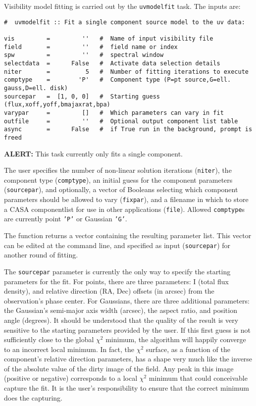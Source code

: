 Visibility model fitting is carried out by the {\tt uvmodelfit} task.
The inputs are:
\small
\begin{verbatim}
#  uvmodelfit :: Fit a single component source model to the uv data:

vis         =         ''   #  Name of input visibility file
field       =         ''   #  field name or index
spw         =         ''   #  spectral window
selectdata  =      False   #  Activate data selection details
niter       =          5   #  Number of fitting iterations to execute
comptype    =        'P'   #  Component type (P=pt source,G=ell. gauss,D=ell. disk)
sourcepar   =  [1, 0, 0]   #  Starting guess (flux,xoff,yoff,bmajaxrat,bpa)
varypar     =         []   #  Which parameters can vary in fit
outfile     =         ''   #  Optional output component list table
async       =      False   #  if True run in the background, prompt is freed
\end{verbatim}
\normalsize
{\bf ALERT:} This task currently only fits a single component.

The user specifies the number of non-linear solution
iterations ({\tt niter}), the component type ({\tt comptype}), an
initial guess for the component parameters ({\tt sourcepar}), and
optionally, a vector of Booleans selecting which component parameters
should be allowed to vary ({\tt fixpar}), and a filename in which to
store a CASA componentlist for use in other applications ({\tt file}).
Allowed {\tt comptype}s are currently point {\tt 'P'} or
Gaussian {\tt 'G'}.

The function returns a vector containing the resulting parameter list.
This vector can be edited at the command line, and specified as input
({\tt sourcepar}) for another round of fitting.

The {\tt sourcepar} parameter is currently the only way to specify the
starting parameters for the fit.  For points, there are three
parameters: I (total flux density), and relative direction (RA, Dec)
offsets (in arcsec) from the observation's phase center.  For
Gaussians, there are three additional parameters: the Gaussian's
semi-major axis width (arcsec), the aspect ratio, and position angle
(degrees).  It should be understood that the quality of the result is
very sensitive to the starting parameters provided by the user.  If
this first guess is not sufficiently close to the global $\chi^2$
minimum, the algorithm will happily converge to an incorrect local
minimum.  In fact, the $\chi^2$ surface, as a function of the
component's relative direction parameters, has a shape very much like
the inverse of the absolute value of the dirty image of the field.
Any peak in this image (positive or negative) corresponds to a local
$\chi^2$ minimum that could conceivable capture the fit.  It is the
user's responsibility to ensure that the correct minimum does the
capturing.

